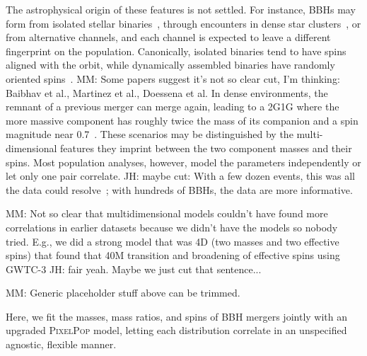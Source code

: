 \documentclass[%
    aps,
    prl,
    reprint,
    superscriptaddress,
    nolongbibliography,
    nobibnotes,
    nofootinbib,
    linenumbers,
    amsmath,amssymb,
]{revtex4-2}
\newcommand{\twoGoneG}{\ac{2G1G}\xspace}
\newcommand{\jh}[1]{{\color{orange}JH: #1}}
\newcommand{\mm}[1]{{\color{ForestGreen}MM: #1}}
\newcommand{\PixelPop}{\textsc{PixelPop}\xspace}
\begin{document}
The astrophysical origin of these features is not settled. For instance, \acp{BBH} may form from isolated stellar binaries~\cite{Belczynski:2016obo, Stevenson:2017tfq, vanSon:2022myr}, through encounters in dense star clusters~\cite{Rodriguez:2016vmx, Antonini:2022vib}, or from alternative channels, and each channel is expected to leave a different fingerprint on the population. Canonically, isolated binaries tend to have spins aligned with the orbit, while dynamically assembled binaries have randomly oriented spins~\cite{Mandel:2009nx, Rodriguez:2016vmx, Farr:2017uvj}.
\mm{Some papers suggest it's not so clear cut, I'm thinking: Baibhav et al., Martinez et al., Doessena et al.}
In dense environments, the remnant of a previous merger can merge again, leading to a \twoGoneG where the more massive component has roughly twice the mass of its companion and a spin magnitude near 0.7~\cite{Gerosa:2017kvu, Fishbach:2017dwv, Gerosa:2021mno}. These scenarios may be distinguished by the multi-dimensional features they imprint between the two component masses and their spins. Most population analyses, however, model the parameters independently or let only one pair correlate. \jh{maybe cut:} With a few dozen events, this was all the data could resolve~\cite[e.g.,][]{Biscoveanu:2022qac}; with hundreds of \acp{BBH}, the data are more informative.

\mm{Not so clear that multidimensional models couldn't have found more correlations in earlier datasets because we didn't have the models so nobody tried. E.g., we did a strong model that was 4D (two masses and two effective spins) that found that 40M transition and broadening of effective spins using GWTC-3} \jh{fair yeah. Maybe we just cut that sentence...}

\mm{Generic placeholder stuff above can be trimmed.}


Here, we fit the masses, mass ratios, and spins of BBH mergers jointly with an upgraded \PixelPop \cite{Heinzel:2024jlc, Heinzel:2024hva, Alvarez-Lopez:2025ltt} model, letting each distribution correlate in an unspecified agnostic, flexible manner.
\end{document}
